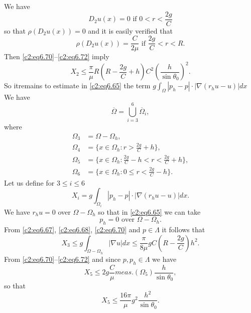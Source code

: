 We have
\begin{equation}
D_2 u(x) = 0 \text{ if } 0 < r <
\frac{2g}{C}\tag{6.71}\label{c2:eq6.71}  
\end{equation}
so that $\rho (D_2 u(x)) =0 $ and it is easily verified that 
\begin{equation}
\rho (D_2 u(x)) = \frac{C}{2 \mu} \text{ if } \frac{2g}{C}< r <
R. \tag{6.72} \label{c2:eq6.72}
\end{equation}
Then \eqref{c2:eq6.70}--\eqref{c2:eq6.72} imply
\begin{equation}
X_2 \leq \frac{\pi}{\mu} R (R- \frac{2g}{C}+ h) C^2 \left(\frac{h}{\sin
  \theta_0}\right)^2.\tag{6.73}\label{c2:eq6.73} 
\end{equation}
So it\pageoriginale  remains to estimate in \eqref{c2:eq6.65} the term $g \int_\Omega | p_h  - p
| \cdot | \nabla (r_h u- u)| dx $ We have  
\begin{equation}
\overline{\Omega} = \bigcup^6_{i = 3} \overline{\Omega}_i,
\tag{6.74}\label{c2:eq6.74}  
\end{equation}
where
\begin{align*}
\Omega_3 & = \Omega - \Omega_h,\\
\Omega_4 & = \{x \in \Omega_h : r> \frac{2g}{C}+ h\},\\ 
\Omega_5 & = \{x \in \Omega_h : \frac{2g}{C}- h < r <
\frac{2g}{C} + h\},\\ 
\Omega_6 & = \{ x \in \Omega_h : 0 \leq r < \frac{2g}{C} - h \}. 
\end{align*}
Let us define for $3 \leq i \leq 6$
\begin{equation}
X_i = g \int_{\Omega_i} |p_h - p| \cdot | \nabla (r_h u-u) |
dx. \tag{6.75}\label{c2:eq6.75}  
\end{equation}
We have $r_h u = 0 $ over $\Omega - \Omega_h $ so that in
\eqref{c2:eq6.65} we can take  
\begin{equation}
p_h = 0 \text{ over } \Omega - \Omega_h. \tag{6.76}\label{c2:eq6.76}  
\end{equation}
From \eqref{c2:eq6.67}, \eqref{c2:eq6.68}, \eqref{c2:eq6.70} and $p
\in \Lambda  $ it follows that  
\begin{equation}
X_3 \leq g \int_{\Omega - \Omega_h} |\nabla u| dx \leq
\frac{\pi}{8 \mu} gC (R- \frac{2g}{C})
h^2. \tag{6.77}\label{c2:eq6.77}  
\end{equation}
From \eqref{c2:eq6.70}--\eqref{c2:eq6.72} and since $p, p_h \in
\Lambda  $ we have 
$$
X_5 \leq 2g \frac{C}{\mu} meas. (\Omega_5) \frac{h}{\sin \theta_0}, 
$$
so that 
\begin{equation}
X_5 \leq \frac{16 \pi}{\mu} g^2 \frac{h^2}{\sin
  \theta_0}. \tag{6.78}\label{c2:eq6.78}  
\end{equation} 

